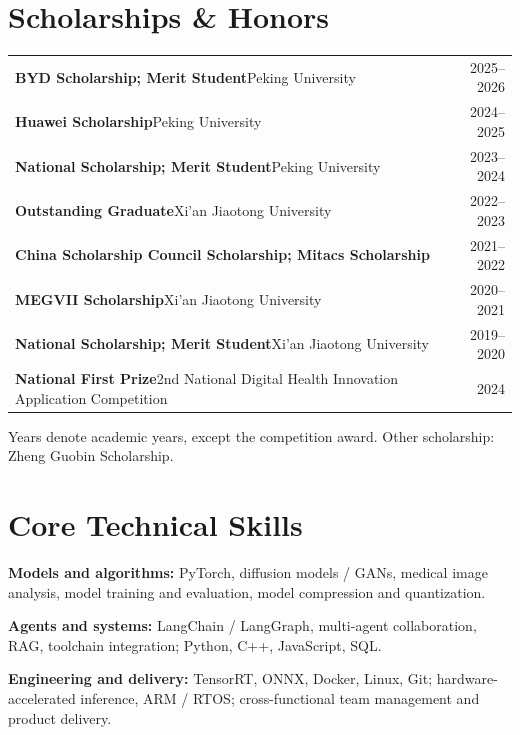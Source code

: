 \documentclass[10pt,a4paper]{article}
\begin{document}
\section{Scholarships \& Honors}
\begin{tabularx}{\linewidth}{@{}>{\raggedright\arraybackslash}X r@{}}
\textbf{BYD Scholarship; Merit Student}\quad Peking University & 2025--2026\\[3pt]
\textbf{Huawei Scholarship}\quad Peking University & 2024--2025\\[3pt]
\textbf{National Scholarship; Merit Student}\quad Peking University & 2023--2024\\[3pt]
\textbf{Outstanding Graduate}\quad Xi'an Jiaotong University & 2022--2023\\[3pt]
\textbf{China Scholarship Council Scholarship; Mitacs Scholarship} & 2021--2022\\[3pt]
\textbf{MEGVII Scholarship}\quad Xi'an Jiaotong University & 2020--2021\\[3pt]
\textbf{National Scholarship; Merit Student}\quad Xi'an Jiaotong University & 2019--2020\\[3pt]
\textbf{National First Prize}\quad 2nd National Digital Health Innovation Application Competition & 2024\\
\end{tabularx}\par
{\small\color{muted}Years denote academic years, except the competition award. Other scholarship: Zheng Guobin Scholarship.}

\section{Core Technical Skills}
{\small
\textbf{Models and algorithms:} PyTorch, diffusion models / GANs, medical image analysis, model training and evaluation, model compression and quantization.\par
\textbf{Agents and systems:} LangChain / LangGraph, multi-agent collaboration, RAG, toolchain integration; Python, C++, JavaScript, SQL.\par
\textbf{Engineering and delivery:} TensorRT, ONNX, Docker, Linux, Git; hardware-accelerated inference, ARM / RTOS; cross-functional team management and product delivery.
}
\end{document}
